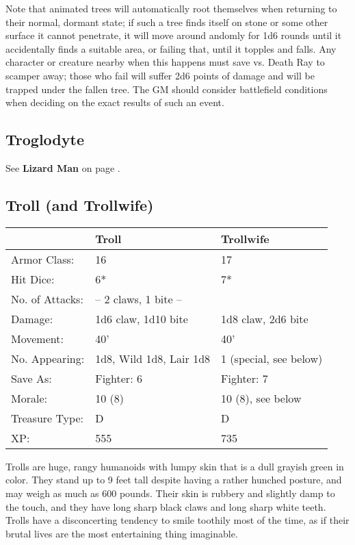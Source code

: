 \documentclass[a4paper,twoside,openany,10pt]{book}
\begin{document}
\begin{multicols}{2}
Note that animated trees will automatically root themselves when returning to their normal, dormant state; if such a tree finds itself on stone or some other surface it cannot penetrate, it will move around andomly for 1d6 rounds until it accidentally finds a suitable area, or failing that, until it topples and falls. Any character or creature nearby when this happens must save vs. Death Ray to scamper away; those who fail will suffer 2d6 points of damage and will be trapped under the fallen tree. The GM should consider battlefield conditions when deciding on the exact results of such an event.

\subsection*{Troglodyte}\label{troglodyte}

See \textbf{Lizard Man }on page
\hyperlink{lizard-man}{\pageref{lizard-man}}.

\subsection*{Troll (and Trollwife)}\label{troll-and-trollwife}

\begin{tabularx}{0.50\textwidth}{@{}lXX@{}}
& Troll & Trollwife \\\hline
Armor Class: & 16 & 17 \\\hline
Hit Dice: & 6* & 7* \\\hline
No. of Attacks: & -- 2 claws, 1 bite -- & \\\hline
Damage: & 1d6 claw, 1d10 bite & 1d8 claw, 2d6 bite \\\hline
Movement: & 40' & 40' \\\hline
No. Appearing: & 1d8, Wild 1d8, Lair 1d8 & 1 (special, see below) \\\hline
Save As: & Fighter: 6 & Fighter: 7 \\\hline
Morale: & 10 (8) & 10 (8), see below \\\hline
Treasure Type: & D & D \\\hline
XP: & 555 & 735 \\\hline
\end{tabularx}\medskip

Trolls are huge, rangy humanoids with lumpy skin that is a dull grayish green in color. They stand up to 9 feet tall despite having a rather hunched posture, and may weigh as much as 600 pounds. Their skin is rubbery and slightly damp to the touch, and they have long sharp black claws and long sharp white teeth. Trolls have a disconcerting tendency to smile toothily most of the time, as if their brutal lives are the most entertaining thing imaginable.


\end{multicols}
\end{document}
